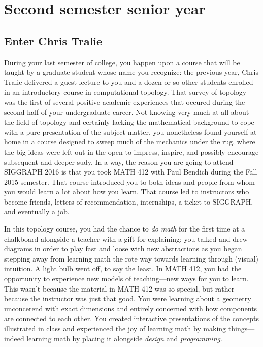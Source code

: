 \documentclass[../main.tex]{subfiles}
\begin{document}
\section{Second semester senior year}

\subsection{Enter Chris Tralie}
 
During your last semester of college, you happen upon a course that will be taught by a graduate student whose name you recognize: the previous year, Chris Tralie delivered a guest lecture to you and a dozen or so other students enrolled in an introductory course in computational topology. That survey of topology was the first of several positive academic experiences that occured during the second half of your undergraduate career. Not knowing very much at all about the field of topology and certainly lacking the mathematical background to cope with a pure presentation of the subject matter, you nonetheless found yourself at home in a course designed to sweep much of the mechanics under the rug, where the big ideas were left out in the open to impress, inspire, and possibly encourage subsequent and deeper sudy. In a way, the reason you are going to attend SIGGRAPH 2016 is that you took MATH 412 with Paul Bendich during the Fall 2015 semester. That course introduced you to both ideas and people from whom you would learn a lot about how you learn. That course led to instructors who become friends, letters of recommendation, internships, a ticket to SIGGRAPH, and eventually a job.

In this topology course, you had the chance to \textit{do math} for the first time at a chalkboard alongside a teacher with a gift for explaining; you talked and drew diagrams in order to play fast and loose with new abstractions as you began stepping away from learning math the rote way towards learning through (visual) intuition. A light bulb went off, to say the least. In MATH 412, you had the opportunity to experience new models of teaching---new ways for you to learn. This wasn't because the material in MATH 412 was so special, but rather because the instructor was just that good. You were learning about a geometry unconcerend with exact dimensions and entirely concerned with how components are connected to each other. You created interactive presentations of the concepts illustrated in class and experienced the joy of learning math by making things---indeed learning math by placing it alongside \textit{design} and \textit{programming}.
\end{document}
